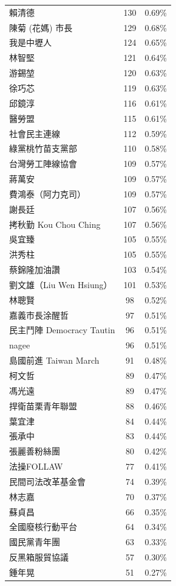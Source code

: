 \documentclass[letterpaper, 10pt, conference]{ieeeconf}   %
\begin{document}
\begin{CJK}{UTF8}{bsmi}
\begin{longtable}[c]{@{}lcc@{}}
賴清德 & 130 & 0.69\% \\
陳菊 (花媽) 市長 & 129 & 0.68\% \\
我是中壢人 & 124 & 0.65\% \\
林智堅 & 121 & 0.64\% \\
游錫堃 & 120 & 0.63\% \\
徐巧芯 & 119 & 0.63\% \\
邱鏡淳 & 116 & 0.61\% \\
醫勞盟 & 115 & 0.61\% \\
社會民主連線 & 112 & 0.59\% \\
綠黨桃竹苗支黨部 & 110 & 0.58\% \\
台灣勞工陣線協會 & 109 & 0.57\% \\
蔣萬安 & 109 & 0.57\% \\
費鴻泰（阿力克司） & 109 & 0.57\% \\
謝長廷 & 107 & 0.56\% \\
拷秋勤 Kou Chou Ching & 107 & 0.56\% \\
吳宜臻 & 105 & 0.55\% \\
洪秀柱 & 105 & 0.55\% \\
蔡錦隆加油讚 & 103 & 0.54\% \\
劉文雄（Liu Wen Hsiung） & 101 & 0.53\% \\
林聰賢 & 98 & 0.52\% \\
嘉義市長涂醒哲 & 97 & 0.51\% \\
民主鬥陣 Democracy Tautin & 96 & 0.51\% \\
nagee & 96 & 0.51\% \\
島國前進 Taiwan March & 91 & 0.48\% \\
柯文哲 & 89 & 0.47\% \\
馮光遠 & 89 & 0.47\% \\
捍衛苗栗青年聯盟 & 88 & 0.46\% \\
葉宜津 & 84 & 0.44\% \\
張承中 & 83 & 0.44\% \\
張麗善粉絲團 & 80 & 0.42\% \\
法操FOLLAW & 77 & 0.41\% \\
民間司法改革基金會 & 74 & 0.39\% \\
林志嘉 & 70 & 0.37\% \\
蘇貞昌 & 66 & 0.35\% \\
全國廢核行動平台 & 64 & 0.34\% \\
國民黨青年團 & 63 & 0.33\% \\
反黑箱服貿協議 & 57 & 0.30\% \\
鍾年晃 & 51 & 0.27\% \\

\end{longtable}
\end{CJK}
\end{document}
